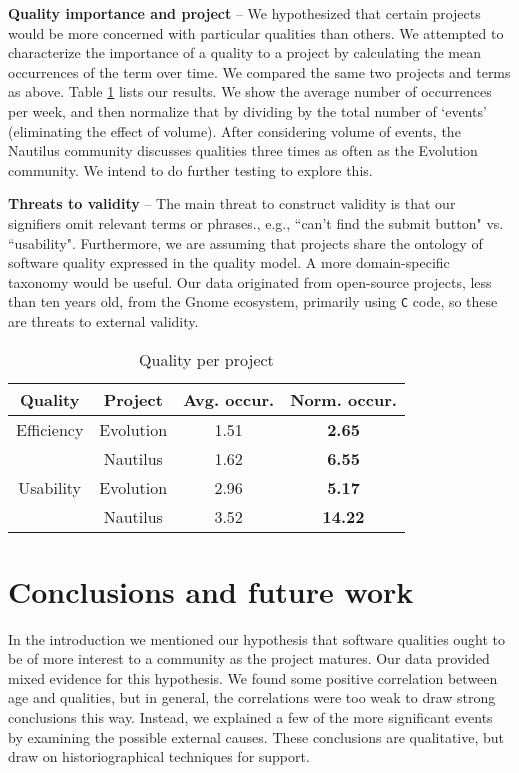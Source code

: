 \documentclass[conference, compsoc]{IEEEtran}
\begin{document}
\noindent\textbf{Quality importance and project} -- We hypothesized that certain projects would be more concerned with particular qualities than others. We attempted to characterize the importance of a quality to a project by calculating the mean occurrences of the term over time. We compared the same two projects and terms as above. Table \ref{tbl:quality-project} lists our results. We show the average number of occurrences per week, and then normalize that by dividing by the total number of `events' (eliminating the effect of volume). After considering volume of events, the Nautilus community discusses qualities three times as often as the Evolution community. We intend to do further testing to explore this.

\noindent\textbf{Threats to validity} -- The main threat to construct validity is that our signifiers omit relevant terms or phrases., e.g., ``can't find the submit button" vs. ``usability". Furthermore, we are assuming that projects share the ontology of software quality expressed in the quality model. A more domain-specific taxonomy would be useful. Our data originated from open-source projects, less than ten years old, from the Gnome ecosystem, primarily using \texttt{C} code, so these are threats to external validity.

\begin{table}[b]
	\caption{Quality per project}
	\centering
	\label{tbl:quality-project}
\begin{tabular}{|c|c|c|c|}
\hline
\rowcolor[gray]{.9} 
Quality & Project & Avg. occur. & Norm. occur.\\ \hline
Efficiency & Evolution & 1.51 & \textbf{2.65}\\
 & Nautilus & 1.62 &\textbf{ 6.55}\\\hline
Usability & Evolution & 2.96 & \textbf{5.17}\\
 & Nautilus & 3.52 & \textbf{14.22}\\
\hline
\end{tabular}
\end{table}

\vspace{-2mm}
\section{Conclusions and future work}
\vspace{-2mm}
In the introduction we mentioned our hypothesis that software qualities ought to be of more interest to a community as the project matures. Our data provided mixed evidence for this hypothesis. We found some positive correlation between age and qualities, but in general, the correlations were too weak to draw strong conclusions this way. Instead, we explained a few of the more significant events by examining the possible external causes. These conclusions are qualitative, but draw on historiographical techniques for support.
\end{document}
